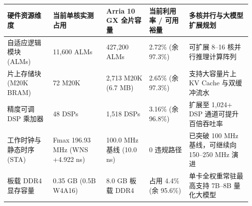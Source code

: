 \documentclass[11pt,a4paper]{article}
\begin{document}
{\footnotesize\renewcommand{\arraystretch}{1.14}\begin{longtable}{@{}L{0.19\textwidth}L{0.16\textwidth}L{0.16\textwidth}L{0.15\textwidth}L{0.24\textwidth}@{}}\toprule

\textbf{硬件资源维度} & \textbf{当前单核实测占用} & \textbf{Arria 10 GX 全片容量} & \textbf{当前利用率 /\allowbreak{} 可用裕量} & \textbf{多核并行与大模型扩展规划}\\\midrule\endhead

自适应逻辑模块 (\allowbreak{}ALMs)\allowbreak{} & 11,\allowbreak{}600 ALMs & 427,\allowbreak{}200 ALMs & 2.72\% (\allowbreak{}余 97.3\%)\allowbreak{} & 可扩展 8–16 核并行推理计算阵列\\[2pt]

片上存储块 (\allowbreak{}M20K BRAM)\allowbreak{} & 72 M20K & 2,\allowbreak{}713 M20K (\allowbreak{}6.7 MB)\allowbreak{} & 2.65\% (\allowbreak{}余 97.3\%)\allowbreak{} & 支持大容量片上 KV Cache 与双缓冲流水\\[2pt]

精度可调 DSP 乘加器 & 48 DSPs & 1,\allowbreak{}518 DSPs & 3.16\% (\allowbreak{}余 96.8\%)\allowbreak{} & 扩展至 1,\allowbreak{}024+\allowbreak{} DSP 通道可提升百倍吞吐率\\[2pt]

工作时钟与静态时序 (\allowbreak{}STA)\allowbreak{} & Fmax 196.93 MHz (\allowbreak{}WNS +\allowbreak{}4.922 ns)\allowbreak{} & 100.0 MHz 基线 (\allowbreak{}10.0 ns)\allowbreak{} & 0 违规路径 & 已突破 100 MHz 基线，可继续向 150–250 MHz 演进\\[2pt]

板载 DDR4 显存容量 & 0.35 GB (\allowbreak{}0.5B W4A16)\allowbreak{} & 8.0 GB 板载 DDR4 & 占用 4.4\% (\allowbreak{}余 95.6\%)\allowbreak{} & 单卡全权重常驻最高支持 7B–8B 量化大模型\\[2pt]

\bottomrule\end{longtable}}
\end{document}
